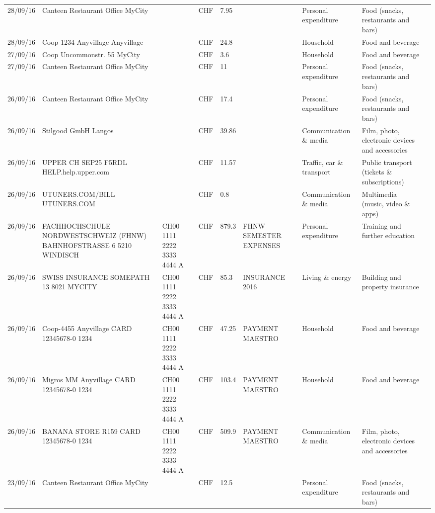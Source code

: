 \begin{landscape}
\begin{tiny}
\begin{longtable}{lp{4cm}llllp{3cm}ll}
		    28/09/16 & Canteen Restaurant Office      MyCity &       & CHF   & 7.95  &       & Personal expenditure & Food (snacks, restaurants and bars) \\
		    28/09/16 & Coop-1234 Anyvillage    Anyvillage &       & CHF   & 24.8  &       & Household & Food and beverage \\
		    27/09/16 & Coop Uncommonstr. 55   MyCity &       & CHF   & 3.6   &       & Household & Food and beverage \\
		    27/09/16 & Canteen Restaurant Office      MyCity &       & CHF   & 11    &       & Personal expenditure & Food (snacks, restaurants and bars) \\
		    26/09/16 & Canteen Restaurant Office      MyCity &       & CHF   & 17.4  &       & Personal expenditure & Food (snacks, restaurants and bars) \\
		    26/09/16 & Stilgood GmbH             Langos &       & CHF   & 39.86 &       & Communication \& media & Film, photo, electronic devices and accessories \\
		    26/09/16 & UPPER CH SEP25 F5RDL HELP.help.upper.com &       & CHF   & 11.57 &       & Traffic, car \& transport & Public transport (tickets \& subscriptions) \\
		    26/09/16 & UTUNERS.COM/BILL          UTUNERS.COM &       & CHF   & 0.8   &       & Communication \& media & Multimedia (music, video \& apps) \\
		    26/09/16 & FACHHOCHSCHULE NORDWESTSCHWEIZ (FHNW) BAHNHOFSTRASSE 6 5210 WINDISCH & CH00 1111 2222 3333 4444 A & CHF   & 879.3 & FHNW SEMESTER EXPENSES & Personal expenditure & Training and further education \\
		    26/09/16 & SWISS INSURANCE SOMEPATH 13 8021 MYCITY & CH00 1111 2222 3333 4444 A & CHF   & 85.3  & INSURANCE 2016 & Living \& energy & Building and property insurance \\
		    26/09/16 & Coop-4455 Anyvillage CARD 12345678-0 1234 & CH00 1111 2222 3333 4444 A & CHF   & 47.25 & PAYMENT MAESTRO & Household & Food and beverage \\
		    26/09/16 & Migros MM Anyvillage CARD 12345678-0 1234 & CH00 1111 2222 3333 4444 A & CHF   & 103.4 & PAYMENT MAESTRO & Household & Food and beverage \\
		    26/09/16 & BANANA STORE R159 CARD 12345678-0 1234 & CH00 1111 2222 3333 4444 A & CHF   & 509.9 & PAYMENT MAESTRO & Communication \& media & Film, photo, electronic devices and accessories \\
		    23/09/16 & Canteen Restaurant Office      MyCity &       & CHF   & 12.5  &       & Personal expenditure & Food (snacks, restaurants and bars) \\

\end{longtable}
\end{tiny}
\end{landscape}
